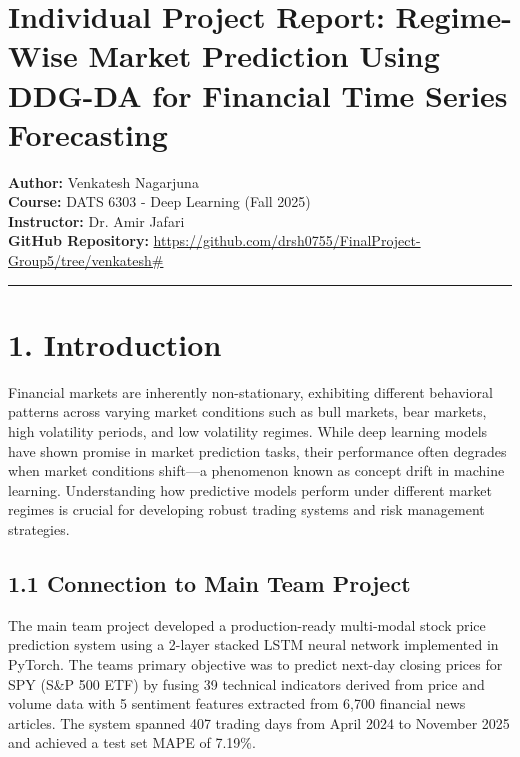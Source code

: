 \documentclass[
]{article}
\author{Venkatesh}
\date{December 7, 2025}
\begin{document}
\section{Individual Project Report: Regime-Wise Market Prediction Using DDG-DA for Financial Time Series Forecasting}\label{Individual Project Report: Regime-Wise Market Prediction Using DDG-DA for Financial Time Series Forecasting}

\textbf{Author:} Venkatesh Nagarjuna\\
\textbf{Course:} DATS 6303 - Deep Learning (Fall 2025)\\
\textbf{Instructor:} Dr. Amir Jafari\\
\textbf{GitHub Repository:}
\url{https://github.com/drsh0755/FinalProject-Group5/tree/venkatesh#}

\begin{center}\rule{0.5\linewidth}{0.5pt}\end{center}

\section{1. Introduction}\label{1-introduction}

Financial markets are inherently non-stationary, exhibiting different
behavioral patterns across varying market conditions such as bull
markets, bear markets, high volatility periods, and low volatility
regimes. While deep learning models have shown promise in market
prediction tasks, their performance often degrades when market
conditions shift---a phenomenon known as concept drift in machine
learning. Understanding how predictive models perform under different
market regimes is crucial for developing robust trading systems and risk
management strategies.

\subsection{1.1 Connection to Main Team
Project}\label{11-connection-to-main-team-project}

The main team project developed a production-ready multi-modal stock
price prediction system using a 2-layer stacked LSTM neural network
implemented in PyTorch. The team\textquotesingle s primary objective was
to predict next-day closing prices for SPY (S\&P 500 ETF) by fusing 39
technical indicators derived from price and volume data with 5 sentiment
features extracted from 6,700 financial news articles. The system
spanned 407 trading days from April 2024 to November 2025 and achieved a
test set MAPE of 7.19\%.
\end{document}
